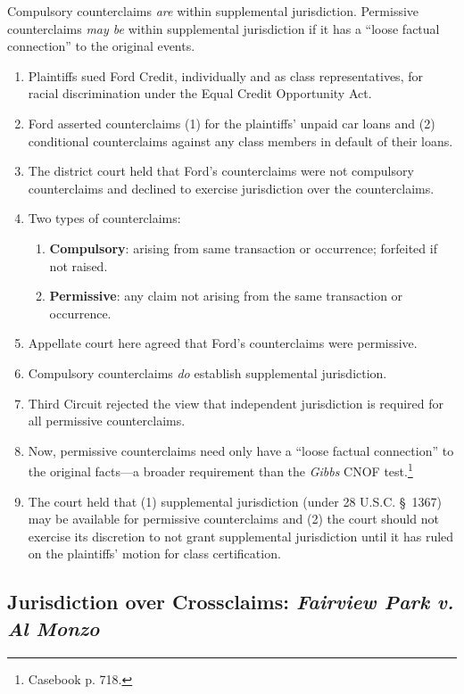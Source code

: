 Compulsory counterclaims \emph{are} within supplemental jurisdiction. 
Permissive counterclaims \emph{may be} within supplemental jurisdiction if it 
has a ``loose factual connection'' to the original events.

\begin{enumerate}
    \item Plaintiffs sued Ford Credit, individually and as class 
    representatives, for racial discrimination under the Equal Credit 
    Opportunity Act.
    \item Ford asserted counterclaims (1) for the plaintiffs' unpaid car loans 
    and (2) conditional counterclaims against any class members in default of 
    their loans.
    \item The district court held that Ford's counterclaims were not compulsory 
    counterclaims and declined to exercise jurisdiction over the 
    counterclaims.
    \item Two types of counterclaims:
    \begin{enumerate}
        \item \textbf{Compulsory}: arising from same transaction or 
        occurrence; forfeited if not raised.
        \item \textbf{Permissive}: any claim not arising from the same 
        transaction or occurrence.
    \end{enumerate}
    \item Appellate court here agreed that Ford's counterclaims were 
    permissive.
    \item Compulsory counterclaims \emph{do} establish supplemental 
    jurisdiction.
    \item Third Circuit rejected the view that independent jurisdiction is 
    required for all permissive counterclaims.
    \item Now, permissive counterclaims need only have a ``loose factual 
    connection'' to the original facts---a broader requirement than the 
    \emph{Gibbs} CNOF test.\footnote{Casebook p. 718.}
    \item The court held that (1) supplemental jurisdiction (under 28 U.S.C. 
    § 1367) may be available for permissive counterclaims and (2) the court 
    should not exercise its discretion to not grant supplemental jurisdiction 
    until it has ruled on the plaintiffs' motion for class certification.
\end{enumerate}

\subsection{Jurisdiction over Crossclaims: \emph{Fairview Park v. Al Monzo}}

